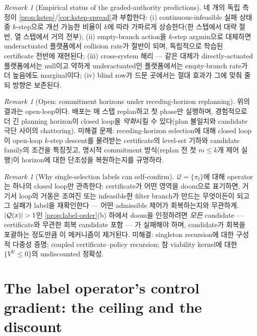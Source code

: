 \documentclass[11pt]{article}
\theoremstyle{plain}
\theoremstyle{definition}
\theoremstyle{remark}
\newtheorem{remark}[theorem]{Remark}
\DeclarePairedDelimiter{\abs}{\lvert}{\rvert}
\newcommand{\calU}{\mathcal{U}}
\newcommand{\calQ}{\mathcal{Q}}
\begin{document}
\begin{remark}[Empirical status of the graded-authority predictions]\label{rem:kstep-empirical}
네 개의 독립 측정이 \cref{prop:kstep}/\cref{cor:kstep-spread}과 부합한다: (i) continuous-infeasible
실패 상태 중 $k$-step으로 개선 가능한 비율이 $k$에 따라 가파르게 상승한다(한 스텝에서 대략 절반,
열 스텝에서 거의 전부); (ii) empty-branch action을 $k$-step argmin으로 대체하면 underactuated
플랫폼에서 collision rate가 절반이 되며, 독립적으로 학습된 certificate 전반에 재현된다; (iii)
cross-system 해리 --- 같은 대체가 directly-actuated 플랫폼에서는 null이고 약하게 underactuated인
플랫폼에서는 empty-branch rate가 더 높음에도 marginal이다; (iv) blind row가 드문 곳에서는 절대
효과가 그에 맞춰 줄되 방향은 보존된다.
\end{remark}

\begin{remark}[Open: commitment horizons under receding-horizon replanning]\label{rem:kstep-commit}
위의 결과는 open-loop이다. 배포는 매 스텝 replan하고 첫 phase만 실행하며, 경험적으로 더 긴 planning
horizon이 closed loop을 \emph{악화}시킬 수 있다(plan 불일치와 candidate 극단 사이의 chattering).
미해결 문제: receding-horizon selection에 대해 closed loop이 open-loop $k$-step descent를
물려받는 certificate의 level-set 기하와 candidate family의 조건을 특징짓고, 명시적 commitment
방식(replan 전 첫 $m\le k$개 제어 실행)이 horizon에 대한 단조성을 복원하는지를 규명하라.
\end{remark}

\begin{remark}[Why single-selection labels can self-confirm]\label{rem:label-trap}
$\calQ=\{\pi_{\mathrm f}\}$에 대해 operator는 하나의 closed loop만 관측한다: certificate가 어떤
영역을 doom으로 표기하면, 거기서 loop의 거동은 조여진 또는 infeasible한 filter branch가 만드는
무엇이든이 되고 그 실패가 label을 재확인한다 --- 어떤 admissible 제어가 회복하는지와 무관하게.
$\abs{\calQ(x)}>1$인 \cref{prop:label-order}(b) 하에서 doom을 인정하려면 \emph{모든} candidate ---
certificate와 무관한 회복 candidate 포함 --- 가 실패해야 하며, candidate가 회복을 포괄하는 정도만큼
이 메커니즘이 제거된다. 미해결: singleton recursion에 대한 구성적 다중성 증명; coupled
certificate--policy recursion; 참 viability kernel에 대한 $\{V^{\calU}\le0\}$의 undiscounted 정확성.
\end{remark}

\section{The label operator's control gradient: the ceiling and the discount}\label{sec:labgrad}
\end{document}
